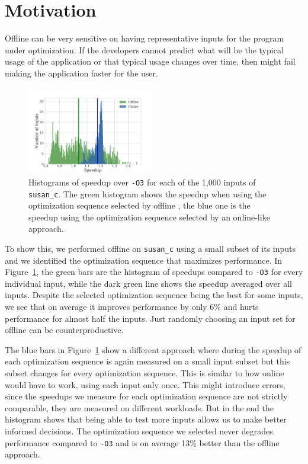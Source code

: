 \section{Motivation}

Offline \itercomp can be very sensitive on having representative inputs for the program under optimization. If the developers cannot
predict what will be the typical usage of the application or that typical usage changes over time, then \itercomp might fail making the
application faster for the user.

\begin{figure}[t!]
    \centering
    \includegraphics[width=0.5\textwidth]{figs/motivation-online.pdf}
    \caption{Histograms of speedup over \texttt{-O3} for each of the 1,000 inputs of \texttt{susan\_c}. The green histogram shows the speedup when using
    the optimization sequence selected by offline \itercomp, the blue one is the speedup using the optimization sequence selected by an
    online-like approach.}
    \label{fig:motivation-online}
\end{figure}

To show this, we performed offline \itercomp on \texttt{susan\_c} using a small subset of its inputs and we identified the optimization sequence that
maximizes performance. In Figure~\ref{fig:motivation-online}, the green bars are the histogram of speedups compared to \texttt{-O3} for
every individual input, while the dark green line shows the speedup averaged over all inputs. Despite the selected optimization sequence
being the best for some inputs, we see that on average it improves performance by only 6\% and hurts performance for almost half the
inputs. Just randomly choosing an input set for offline \itercomp can be counterproductive.

The blue bars in Figure~\ref{fig:motivation-online} show a different approach where during \itercomp the speedup of each optimization
sequence is again measured on a small input subset but this subset changes for every optimization sequence. This is similar to how online
\itercomp would have to work, using each input only once. This might introduce errors, since the speedups we measure for each optimization
sequence are not strictly comparable, they are measured on different workloads. But in the end the histogram shows that being able to test
more inputs allows us to make better informed decisions. The optimization sequence we selected never degrades performance compared to
\texttt{-O3} and is on average 13\% better than the offline approach.


